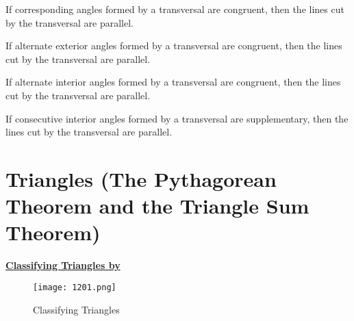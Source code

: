 \begin{tcolorbox}[colback=RoyalPurple!5!white,colframe=RoyalPurple!75!black,title=Corresponding Angles Converse Postulate]
  If corresponding angles formed by a transversal are congruent, then the lines cut by the transversal are parallel.
\end{tcolorbox}

\threestars

\begin{tcolorbox}[colback=Red!5!white,colframe=Red!75!black,title=Alternate Exterior Angles Converse Theorem]
  If alternate exterior angles formed by a transversal are congruent, then the lines cut by the transversal are parallel.
\end{tcolorbox}

\vspace{.2cm}

\begin{tcolorbox}[colback=Red!5!white,colframe=Red!75!black,title=Alternate Interior Angles Converse Theorem]
  If alternate interior angles formed by a transversal are congruent, then the lines cut by the transversal are parallel.
\end{tcolorbox}

\vspace{.2cm}

\begin{tcolorbox}[colback=Red!5!white,colframe=Red!75!black,title=Consecutive Interior Angles Converse Theorem]
  If consecutive interior angles formed by a transversal are supplementary, then the lines cut by the transversal are parallel.
\end{tcolorbox}

\newpage

\section{Triangles (The Pythagorean Theorem and the Triangle Sum Theorem)}

\centerline{\underline{\textbf{\Large Classifying Triangles by}}}


\begin{figure}[htb!]
  \centering
  \texttt{[image: 1201.png]}
  \caption{Classifying Triangles}
\end{figure}

